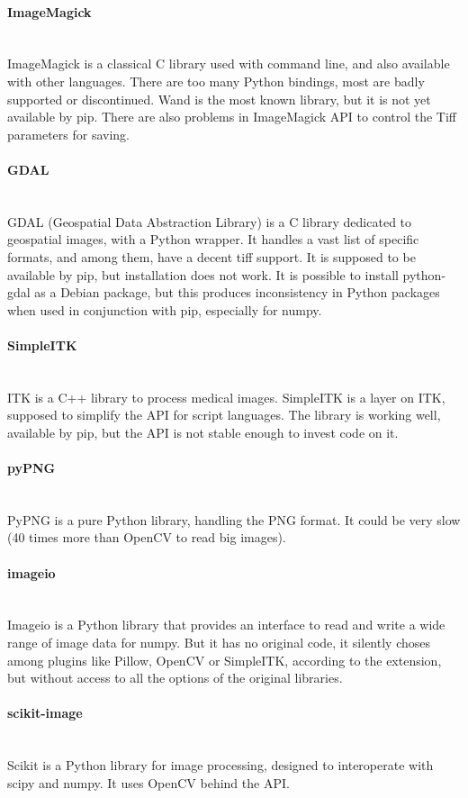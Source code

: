 \paragraph{ImageMagick} \hspace{0pt} \\
ImageMagick is a classical C library used with command line, and also available with other languages. There are too many Python bindings, most are badly supported or discontinued. Wand is the most known library, but it is not yet available by pip. There are also problems in ImageMagick API to control the Tiff parameters for saving.

\paragraph{GDAL} \hspace{0pt} \\
GDAL (Geospatial Data Abstraction Library) is a C library dedicated to geospatial images, with a Python wrapper. It handles a vast list of specific formats, and among them, have a decent tiff support. It is supposed to be available by pip, but installation does not work. It is possible to install python-gdal as a Debian package, but this produces inconsistency in Python packages when used in conjunction with pip, especially for numpy.

\paragraph{SimpleITK} \hspace{0pt} \\
ITK is a C++ library to process medical images. SimpleITK is a layer on ITK, supposed to simplify the API for script languages. The library is working well, available by pip, but the API is not stable enough to invest code on it.

\paragraph{pyPNG} \hspace{0pt} \\
PyPNG is a pure Python library, handling the PNG format. It could be very slow (40 times more than OpenCV to read big images). 

\paragraph{imageio} \hspace{0pt} \\
Imageio is a Python library that provides an interface to read and write a wide range of image data for numpy. But it has no original code, it silently choses among plugins like Pillow, OpenCV or SimpleITK, according to the extension, but without access to all the options of the original libraries.

\paragraph{scikit-image} \hspace{0pt} \\
Scikit is a Python library for image processing, designed to interoperate with scipy and numpy. It uses OpenCV behind the API.




